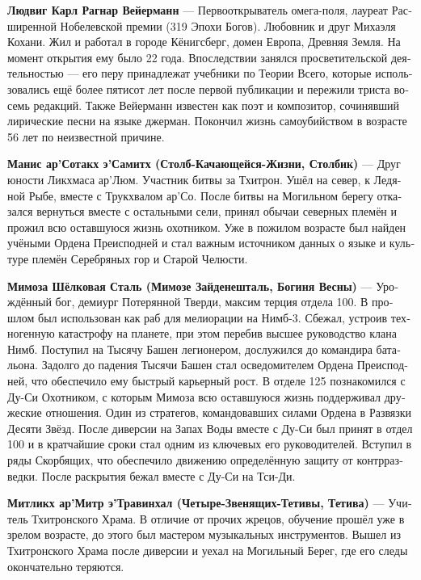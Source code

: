 \documentclass[a4paper,12pt,fleqn]{book}\usepackage{cooltooltips}\usepackage{polyglossia}\setdefaultlanguage[babelshorthands=true]{russian}\setotherlanguage{english}\defaultfontfeatures{Ligatures=TeX,Mapping=tex-text} \usepackage{xcolor}\definecolor{lightgray}{HTML}{bbbbbb}\color{lightgray}\newcommand{\ml}[3]{\textenglish{\textcolor{black}{#3}}}
\newcommand{\theterm}[3]{\textbf{\hypertarget{#1}{#2}} --- #3}
\begin{document}
{\theterm{wajermann}
{Людвиг Карл Рагнар Вейерманн}
{Первооткрыватель омега-поля, лауреат Расширенной Нобелевской премии (319 Эпохи Богов).
Любовник и друг Михаэля Кохани.
Жил и работал в городе Кёнигсберг, домен Европа, Древняя Земля.
На момент открытия ему было 22 года.
Впоследствии занялся просветительской деятельностью --- его перу принадлежат учебники по Теории Всего, которые использовались ещё более пятисот лет после первой публикации и пережили триста восемь редакций.
Также Вейерманн известен как поэт и композитор, сочинявший лирические песни на языке джерман.
Покончил жизнь самоубийством в возрасте 56 лет по неизвестной причине.}

\theterm{little-pier}
{Манис ар'Сотакх э'Самитх (Столб-Качающейся-Жизни, Столбик)}
{Друг юности Ликхмаса ар'Люм.
Участник битвы за Тхитрон.
Ушёл на север, к Ледяной Рыбе, вместе с Трукхвалом ар'Со.
После битвы на Могильном берегу отказался вернуться вместе с остальными сели, принял обычаи северных племён и прожил всю оставшуюся жизнь охотником.
Уже в пожилом возрасте был найден учёными Ордена Преисподней и стал важным источником данных о языке и культуре племён Серебряных гор и Старой Челюсти.}

\theterm{mimosa} %
{Мимоза Шёлковая Сталь (Мимозе Зайденешталь, Богиня Весны)}
{Урождённый бог, демиург Потерянной Тверди, максим терция отдела 100.
В прошлом был использован как раб для мелиорации на Нимб-3.
Сбежал, устроив техногенную катастрофу на планете, при этом перебив высшее руководство клана Нимб.
Поступил на Тысячу Башен легионером, дослужился до командира батальона.
Задолго до падения Тысячи Башен стал осведомителем Ордена Преисподней, что обеспечило ему быстрый карьерный рост.
В отделе 125 познакомился с Ду-Си Охотником, с которым Мимоза всю оставшуюся жизнь поддерживал дружеские отношения.
Один из стратегов, командовавших силами Ордена в Развязки Десяти Звёзд.
После диверсии на Запах Воды вместе с Ду-Си был принят в отдел 100 и в кратчайшие сроки стал одним из ключевых его руководителей.
Вступил в ряды Скорбящих, что обеспечило движению определённую защиту от контрразведки.
После раскрытия бежал вместе с Ду-Си на Тси-Ди.}

\theterm{mitlikch}
{Митликх ар'Митр э'Травинхал (Четыре-Звенящих-Тетивы, Тетива)}
{Учитель Тхитронского Храма.
В отличие от прочих жрецов, обучение прошёл уже в зрелом возрасте, до этого был мастером музыкальных инструментов.
Вышел из Тхитронского Храма после диверсии и уехал на Могильный Берег, где его следы окончательно теряются.}

}
\end{document}
